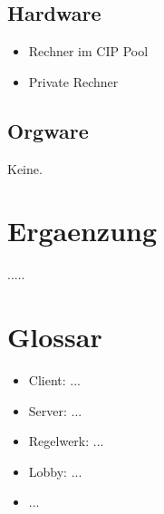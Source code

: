 \documentclass{article}
\begin{document}
\subsection{Hardware}
\begin{itemize}
	\item Rechner im CIP Pool	
	\item Private Rechner
\end{itemize}

\subsection{Orgware}
Keine.

\section{Ergaenzung}
.....
\section{Glossar}
\begin{itemize}
	\item Client: ...
	\item Server: ...
	\item Regelwerk: ...
	\item Lobby: ...
	\item ...
\end{itemize}
\end{document}
